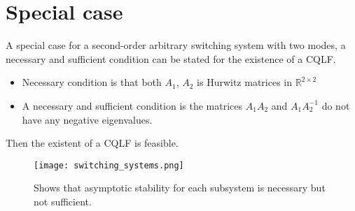 \section{Special case}
A special case for a second-order arbitrary switching system with two modes, a necessary and sufficient condition can be stated for the existence of a CQLF.
\begin{itemize}
        \item Necessary condition is that both $A_1$, $A_2$ is Hurwitz matrices in $\mathbb{R}^{2\times2}$
        \item A necessary and sufficient condition is the matrices $A_1A_2$ and $A_1A_2^{-1}$ do not have any negative eigenvalues.
\end{itemize}
Then the existent of a CQLF is feasible.
\begin{figure}[htbp]
        \centering
        \texttt{[image: switching\_systems.png]}
        \caption{Shows that asymptotic stability for each subsystem is necessary but not sufficient.}
        \label{fig:switching_systems}
\end{figure}